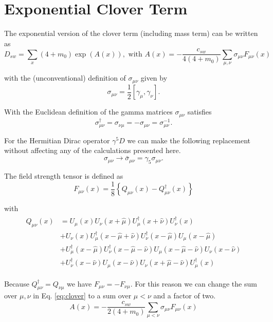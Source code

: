 \documentclass[12pt]{article}
\begin{document}
\section*{Exponential Clover Term}
The exponential version of the clover term  (including mass term) can be written as
\begin{equation}
 D_{sw} = \sum_x  (4+m_0) \exp ( A(x) ), \text{ with } A(x) =  -\frac{c_{sw}}{4(4+m_0)}\sum_{\mu,\nu}\sigma_{\mu\nu}F_{\mu\nu}(x)
 \label{eq:clover}
\end{equation}

with the (unconventional) definition of $\sigma_{\mu\nu}$ given by
\begin{equation}
 \sigma_{\mu\nu} = \frac{1}{2}[\gamma_\mu,\gamma_\nu].
\end{equation}

With the Euclidean definition of the gamma matrices $\sigma_{\mu\nu}$ satisfies
\begin{equation}
 \sigma_{\mu\nu}^\dagger = \sigma_{\nu\mu} = -\sigma_{\mu\nu} = \sigma_{\mu\nu}^{-1}.
\end{equation}

For the Hermitian Dirac operator $\gamma^5D$ we can make the following replacement without affecting any of the calculations presented here.
\begin{equation}
 \sigma_{\mu\nu} \to \bar{\sigma}_{\mu\nu} = \gamma_5\sigma_{\mu\nu}.
\end{equation}

The field strength tensor is defined as
\begin{equation}
 F_{\mu\nu}(x) = \frac{1}{8}\left\{Q_{\mu\nu}(x) - Q_{\mu\nu}^\dagger(x)\right\}
\end{equation}

with
\begin{align}
\begin{split}
 Q_{\mu\nu}(x)
 &= U_\mu(x)U_\nu(x+\hat{\mu})U_\mu^\dagger(x+\hat{\nu})U_\nu^\dagger(x) \\
 &+ U_\nu(x)U_\mu^\dagger(x-\hat{\mu}+\hat{\nu})U_\nu^\dagger(x-\hat{\mu})U_\mu(x-\hat{\mu}) \\
 &+ U_\mu^\dagger(x-\hat{\mu})U_\nu^\dagger(x-\hat{\mu}-\hat{\nu})U_\mu(x-\hat{\mu}-\hat{\nu})U_\nu(x-\hat{\nu}) \\
 &+ U_\nu^\dagger(x-\hat{\nu})U_\mu(x-\hat{\nu})U_\nu(x+\hat{\mu}-\hat{\nu})U_\mu^\dagger(x)
\end{split}
\end{align}

Because $Q_{\mu\nu}^\dagger=Q_{\nu\mu}$ we have $F_{\mu\nu}=-F_{\nu\mu}$. For this reason we can change the sum over $\mu,\nu$ in Eq. \eqref{eq:clover} to a sum over $\mu<\nu$ and a factor of two.
\begin{equation}
 A(x) = -\frac{c_{sw}}{2(4+m_0)}\sum_{\mu<\nu}\sigma_{\mu\nu}F_{\mu\nu}(x)
 \label{eq:clover2}
\end{equation}
\end{document}
